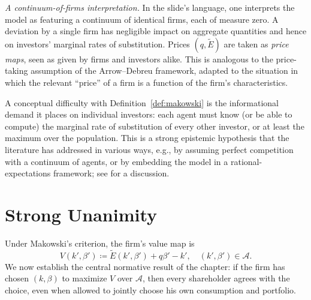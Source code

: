 \documentclass[11pt,a4paper,oneside]{book}
\theoremstyle{plain}
\theoremstyle{definition}
\theoremstyle{remark}
\numberwithin{equation}{chapter}
\begin{document}
\emph{A continuum-of-firms interpretation.}
In the slide's language, one interprets the model as featuring a continuum of identical firms, each of measure zero.
A deviation by a single firm has negligible impact on aggregate quantities and hence on investors' marginal rates of substitution.
Prices $(q, \widetilde{E})$ are taken as \emph{price maps}, seen as given by firms and investors alike.
This is analogous to the price-taking assumption of the Arrow--Debreu framework, adapted to the situation in which the relevant ``price'' of a firm is a function of the firm's characteristics.

A conceptual difficulty with Definition~\ref{def:makowski} is the informational demand it places on individual investors: each agent must know (or be able to compute) the marginal rate of substitution of every other investor, or at least the maximum over the population.
This is a strong epistemic hypothesis that the literature has addressed in various ways, e.g., by assuming perfect competition with a continuum of agents, or by embedding the model in a rational-expectations framework; see \citet{BisinGottardiRuta2015} for a discussion.

\section{Strong Unanimity}
\label{sec:strong-unanimity}

Under Makowski's criterion, the firm's value map is
\begin{equation}\label{eq:firm-value-BGR}
  V(k', \beta') \coloneqq \widetilde{E}(k', \beta') + q \beta' - k',
  \quad (k', \beta') \in \mathcal{A}.
\end{equation}
We now establish the central normative result of the chapter: if the firm has chosen $(k, \beta)$ to maximize $V$ over $\mathcal{A}$, then every shareholder agrees with the choice, even when allowed to jointly choose his own consumption and portfolio.
\end{document}
